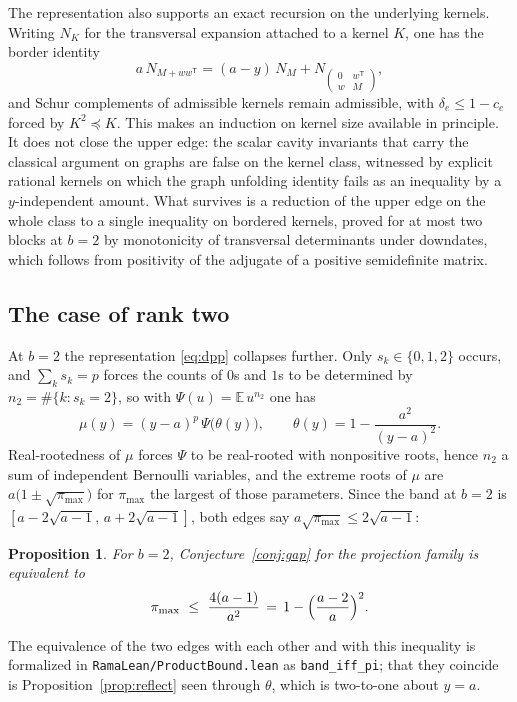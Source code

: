 \documentclass[11pt]{article}
\newtheorem{proposition}[theorem]{Proposition}
\theoremstyle{remark}
\begin{document}
The representation also supports an exact recursion on the underlying kernels.
Writing $N_K$ for the transversal expansion attached to a kernel $K$, one has the
border identity
\[
a\,N_{M+ww^{\mathsf T}}=(a-y)\,N_M+N_{\left(\begin{smallmatrix}0&w^{\mathsf T}\\ w&M\end{smallmatrix}\right)},
\]
and Schur complements of admissible kernels remain admissible, with
$\delta_e\le1-c_e$ forced by $K^2\preceq K$. This makes an induction on kernel size
available in principle. It does not close the upper edge: the scalar cavity
invariants that carry the classical argument on graphs are false on the kernel
class, witnessed by explicit rational kernels on which the graph unfolding identity
fails as an inequality by a $y$-independent amount. What survives is a reduction of
the upper edge on the whole class to a single inequality on bordered kernels, proved
for at most two blocks at $b=2$ by monotonicity of transversal determinants under
downdates, which follows from positivity of the adjugate of a positive semidefinite
matrix.

\subsection{The case of rank two}

At $b=2$ the representation \eqref{eq:dpp} collapses further. Only $s_k\in\{0,1,2\}$
occurs, and $\sum_ks_k=p$ forces the counts of $0$s and $1$s to be determined by
$n_2=\#\{k:s_k=2\}$, so with $\Psi(u)=\mathbb E\,u^{n_2}$ one has
\[
\mu(y)=(y-a)^p\,\Psi\bigl(\theta(y)\bigr),\qquad \theta(y)=1-\frac{a^2}{(y-a)^2}.
\]
Real-rootedness of $\mu$ forces $\Psi$ to be real-rooted with nonpositive roots,
hence $n_2$ a sum of independent Bernoulli variables, and the extreme roots of $\mu$
are $a\bigl(1\pm\sqrt{\pi_{\max}}\bigr)$ for $\pi_{\max}$ the largest of those
parameters. Since the band at $b=2$ is $[a-2\sqrt{a-1},\,a+2\sqrt{a-1}]$, both edges
say $a\sqrt{\pi_{\max}}\le2\sqrt{a-1}$:

\begin{proposition}\label{prop:ineq2}
For $b=2$, Conjecture~\ref{conj:gap} for the projection family is equivalent to
\[
\pi_{\max}\ \le\ \frac{4(a-1)}{a^2}\,=\,1-\Bigl(\frac{a-2}{a}\Bigr)^{2}.
\]
\end{proposition}

The equivalence of the two edges with each other and with this inequality is
formalized in \texttt{RamaLean/ProductBound.lean} as \texttt{band\_iff\_pi}; that
they coincide is Proposition~\ref{prop:reflect} seen through $\theta$, which is
two-to-one about $y=a$.
\end{document}
